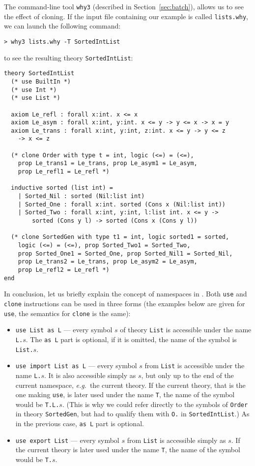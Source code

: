 The command-line tool \texttt{why3} (described in
Section~\ref{sec:batch}), allows us to see the effect of cloning.
If the input file containing our example is called \texttt{lists.why},
we can launch the following command:
\begin{verbatim}
> why3 lists.why -T SortedIntList
\end{verbatim}
to see the resulting theory \texttt{SortedIntList}:
\begin{verbatim}
theory SortedIntList
  (* use BuiltIn *)
  (* use Int *)
  (* use List *)

  axiom Le_refl : forall x:int. x <= x
  axiom Le_asym : forall x:int, y:int. x <= y -> y <= x -> x = y
  axiom Le_trans : forall x:int, y:int, z:int. x <= y -> y <= z
    -> x <= z

  (* clone Order with type t = int, logic (<=) = (<=),
    prop Le_trans1 = Le_trans, prop Le_asym1 = Le_asym,
    prop Le_refl1 = Le_refl *)

  inductive sorted (list int) =
    | Sorted_Nil : sorted (Nil:list int)
    | Sorted_One : forall x:int. sorted (Cons x (Nil:list int))
    | Sorted_Two : forall x:int, y:int, l:list int. x <= y ->
        sorted (Cons y l) -> sorted (Cons x (Cons y l))

  (* clone SortedGen with type t1 = int, logic sorted1 = sorted,
    logic (<=) = (<=), prop Sorted_Two1 = Sorted_Two,
    prop Sorted_One1 = Sorted_One, prop Sorted_Nil1 = Sorted_Nil,
    prop Le_trans2 = Le_trans, prop Le_asym2 = Le_asym,
    prop Le_refl2 = Le_refl *)
end
\end{verbatim}

In conclusion, let us briefly explain the concept of namespaces
in \why. Both \texttt{use} and \texttt{clone} instructions can
be used in three forms (the examples below are given for \texttt{use},
the semantics for \texttt{clone} is the same):
\begin{itemize}
\item \texttt{use List as L} --- every symbol $s$ of theory \texttt{List}
is accessible under the name \texttt{L.$s$}. The \texttt{as L} part is
optional, if it is omitted, the name of the symbol is \texttt{List.$s$}.

\item \texttt{use import List as L} --- every symbol $s$ from
\texttt{List} is accessible under the name \texttt{L.$s$}. It is also
accessible simply as \texttt{$s$}, but only up to the end of the current
namespace, \emph{e.g.}~the current theory. If the current theory, that is the
one making \texttt{use}, is later used under the name \texttt{T},
the name of the symbol would be \texttt{T.L.$s$}. (This is why we
could refer directly to the symbols of \texttt{Order} in theory
\texttt{SortedGen}, but had to qualify them with \texttt{O.}
in \texttt{SortedIntList}.)
As in the previous case, \texttt{as L} part is optional.

\item \texttt{use export List} --- every symbol $s$ from \texttt{List}
is accessible simply as \texttt{$s$}. If the current theory
is later used under the name \texttt{T}, the name of the symbol
would be \texttt{T.$s$}.
\end{itemize}

